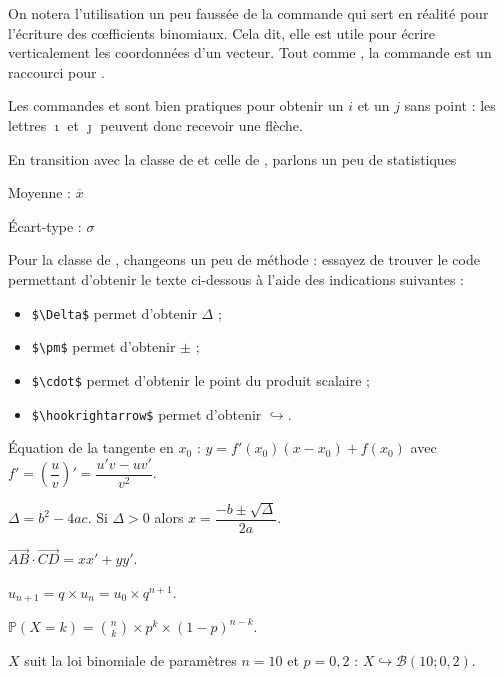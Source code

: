 
On notera l'utilisation un peu faussée de la commande  qui sert en réalité pour l'écriture des c{\oe}fficients binomiaux. Cela dit, elle est utile pour écrire verticalement les coordonnées d'un vecteur. Tout comme , la commande \ordi{\{\}\{\}} est un raccourci pour \ordi{\{\}\{\}}.

\begin{info}
    Les commandes  et  sont bien pratiques pour obtenir un $i$ et un $j$ sans point : les lettres $\imath$ et $\jmath$ peuvent donc recevoir une flèche.
\end{info}

En transition avec la classe de  et celle de , parlons un peu de statistiques \bigskip

{\NewFont
\begin{SideBySideExample}
    Moyenne : $\overline{x}$\par
    \'Ecart-type : $\sigma$
\end{SideBySideExample}
}\bigskip

Pour la classe de , changeons un peu de méthode : essayez de trouver le code permettant d'obtenir le texte ci-dessous à l'aide des indications suivantes :
\begin{itemize}
    \item \verb!$\Delta$! permet d'obtenir $\Delta$ ;
    \item \verb!$\pm$! permet d'obtenir $\pm$ ;
    \item \verb!$\cdot$! permet d'obtenir le point du produit scalaire ;
    \item \verb!$\hookrightarrow$! permet d'obtenir $\hookrightarrow$.
\end{itemize}

\begin{CadreExemple}
\'Equation de la tangente en $x_0$ :
$y = f'(x_0) \left(x - x_0\right) + f(x_0)$ avec
$f' = \left(\dfrac u v\right)' = \dfrac{u'v - uv'}{v^2}$.\medskip

$\Delta = b^2 - 4ac$. Si $\Delta > 0$ alors
$x = \dfrac{-b \pm \sqrt \Delta}{2a}$.\medskip

$\overrightarrow{AB} \cdot \overrightarrow{CD} = xx' + yy'$.\medskip

$u_{n + 1} = q\times u_n = u_0 \times q^{n+1}$.\medskip

$\mathds P(X = k) = \binom n k \times p^k \times (1-p)^{n-k}$.\medskip

$X$ suit la loi binomiale de paramètres $n=10$ et $p=0,2$ :
$X \hookrightarrow \mathcal B(10 ; 0,2)$.
\end{CadreExemple}

